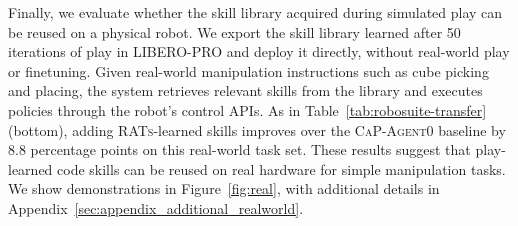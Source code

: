 Finally, we evaluate whether the skill library acquired during simulated play can be reused on a physical robot. We export the skill library learned after 50 iterations of play in LIBERO-PRO and deploy it directly, without real-world play or finetuning. Given real-world manipulation instructions such as cube picking and placing, the system retrieves relevant skills from the library and executes policies through the robot's control APIs. As in Table~\ref{tab:robosuite-transfer} (bottom), adding \textsc{RATs}-learned skills improves over the \textsc{CaP-Agent0} baseline by 8.8 percentage points on this real-world task set. These results suggest that play-learned code skills can be reused on real hardware for simple manipulation tasks. We show demonstrations in Figure~\ref{fig:real}, with additional details in Appendix~\ref{sec:appendix_additional_realworld}.

